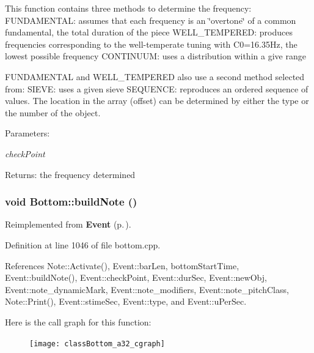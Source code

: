 This function contains three methods to determine the frequency: FUNDAMENTAL: assumes that each frequency is an \char`\"{}overtone\char`\"{} of a common fundamental, the total duration of the piece WELL\_\-TEMPERED: produces frequencies corresponding to the well-temperate tuning with C0=16.35Hz, the lowest possible frequency CONTINUUM: uses a distribution within a give range

FUNDAMENTAL and WELL\_\-TEMPERED also use a second method selected from: SIEVE: uses a given sieve SEQUENCE: reproduces an ordered sequence of values. The location in the array (offset) can be determined by either the type or the number of the object. \begin{Desc}
\item[Parameters:]
\begin{description}
\item[{\em check\-Point}]\end{description}
\end{Desc}
\begin{Desc}
\item[Returns:]the frequency determined \end{Desc}
\subsubsection{\setlength{\rightskip}{0pt plus 5cm}void Bottom::build\-Note ()\hspace{0.3cm}{\tt  [virtual]}}\label{classBottom_a32}




Reimplemented from {\bf Event} {\rm (p.\,\pageref{classEvent_a58})}.

Definition at line 1046 of file bottom.cpp.

References Note::Activate(), Event::bar\-Len, bottom\-Start\-Time, Event::build\-Note(), Event::check\-Point, Event::dur\-Sec, Event::new\-Obj, Event::note\_\-dynamic\-Mark, Event::note\_\-modifiers, Event::note\_\-pitch\-Class, Note::Print(), Event::stime\-Sec, Event::type, and Event::u\-Per\-Sec.

Here is the call graph for this function:\begin{figure}[H]
\begin{center}
\leavevmode
\texttt{[image: classBottom\_a32\_cgraph]}
\end{center}
\end{figure}
